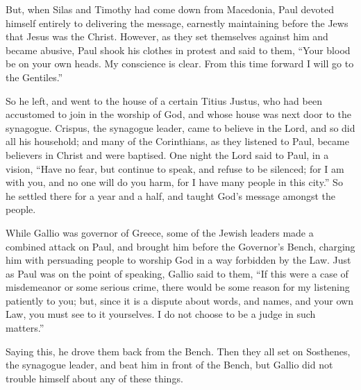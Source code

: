  But, when Silas and Timothy had come down from Macedonia,
Paul devoted himself entirely to delivering the message, earnestly
maintaining before the Jews that Jesus was the Christ. 
However, as they set themselves against him and became abusive, Paul
shook his clothes in protest and said to them, ``Your blood be on your
own heads. My conscience is clear. From this time forward I will go to
the Gentiles.''

 So he left, and went to the house of a certain Titius
Justus, who had been accustomed to join in the worship of God, and whose
house was next door to the synagogue.  Crispus, the
synagogue leader, came to believe in the Lord, and so did all his
household; and many of the Corinthians, as they listened to Paul, became
believers in Christ and were baptised.  One night the Lord
said to Paul, in a vision, ``Have no fear, but continue to speak, and
refuse to be silenced;  for I am with you, and no one will
do you harm, for I have many people in this city.''  So he
settled there for a year and a half, and taught God's message amongst
the people.

 While Gallio was governor of Greece, some of the Jewish
leaders made a combined attack on Paul, and brought him before the
Governor's Bench,  charging him with persuading people to
worship God in a way forbidden by the Law.  Just as Paul
was on the point of speaking, Gallio said to them, ``If this were a case
of misdemeanor or some serious crime, there would be some reason for my
listening patiently to you;  but, since it is a dispute
about words, and names, and your own Law, you must see to it yourselves.
I do not choose to be a judge in such matters.''

 Saying this, he drove them back from the Bench.
 Then they all set on Sosthenes, the synagogue leader, and
beat him in front of the Bench, but Gallio did not trouble himself about
any of these things.

